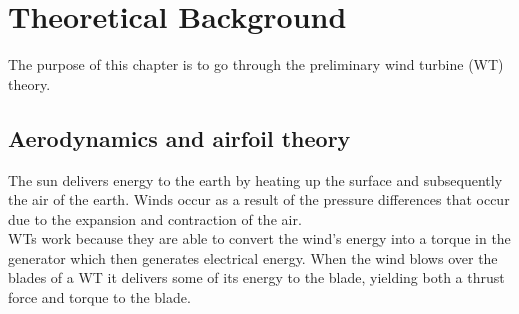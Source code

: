 \section{Theoretical Background} \label{sec:theory}
The purpose of this chapter is to go through the preliminary wind turbine (WT) theory. 

\subsection{Aerodynamics and airfoil theory}
The sun delivers energy to the earth by heating up the surface and subsequently the air of the earth. Winds occur as a result of the pressure differences that occur due to the expansion and contraction of the air. \\

WTs work because they are able to convert the wind's energy into a torque in the generator which then generates electrical energy. When the wind blows over the blades of a WT it delivers some of its energy to the blade, yielding both a thrust force and torque to the blade.

